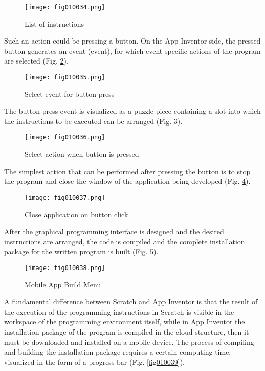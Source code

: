 \begin{figure}[H]
   \centering
   \texttt{[image: fig010034.png]}
   \caption{List of instructions}
\label{fig010034}
\end{figure}

Such an action could be pressing a button. On the App Inventor side, the pressed button generates an event (event), for which event specific actions of the program are selected (Fig. \ref{fig010035}).

\begin{figure}[H]
   \centering
   \texttt{[image: fig010035.png]}
   \caption{Select event for button press}
\label{fig010035}
\end{figure}

The button press event is visualized as a puzzle piece containing a slot into which the instructions to be executed can be arranged (Fig. \ref{fig010036}).

\begin{figure}[H]
   \centering
   \texttt{[image: fig010036.png]}
   \caption{Select action when button is pressed}
\label{fig010036}
\end{figure}

The simplest action that can be performed after pressing the button is to stop the program and close the window of the application being developed (Fig. \ref{fig010037}).

\begin{figure}[H]
   \centering
   \texttt{[image: fig010037.png]}
   \caption{Close application on button click}
\label{fig010037}
\end{figure}

After the graphical programming interface is designed and the desired instructions are arranged, the code is compiled and the complete installation package for the written program is built (Fig. \ref{fig010038}).

\begin{figure}[H]
   \centering
   \texttt{[image: fig010038.png]}
   \caption{Mobile App Build Menu}
\label{fig010038}
\end{figure}

A fundamental difference between Scratch and App Inventor is that the result of the execution of the programming instructions in Scratch is visible in the workspace of the programming environment itself, while in App Inventor the installation package of the program is compiled in the cloud structure, then it must be downloaded and installed on a mobile device. The process of compiling and building the installation package requires a certain computing time, visualized in the form of a progress bar (Fig. \ref{fig010039}).

